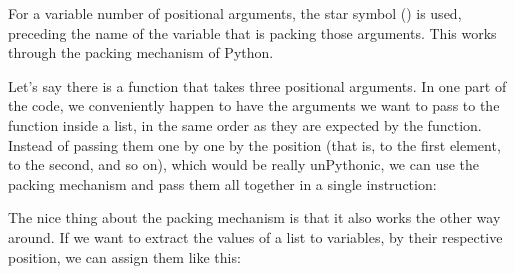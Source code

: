 \documentclass[a4paper,10pt,english]{sphinxmanual}
\begin{document}
For a variable number of positional arguments, the star symbol (\sphinxcode{\sphinxupquote{*}}) is used, preceding the name of the
variable that is packing those arguments. This works through the packing mechanism of Python.

Let’s say there is a function that takes three positional arguments. In one part of the code, we conveniently
happen to have the arguments we want to pass to the function inside a list, in the same order as they are
expected by the function. Instead of passing them one by one by the position (that is,  to the
first element,  to the second, and so on), which would be really un\sphinxhyphen{}Pythonic, we can use the
packing mechanism and pass them all together in a single instruction:

\begin{sphinxVerbatim}[commandchars=\\\{\}]
   
    
    
    
  \PYG{p}{[}  \PYG{p}{]}
\end{sphinxVerbatim}

The nice thing about the packing mechanism is that it also works the other way around. If we want to extract
the values of a list to variables, by their respective position, we can assign them like this:

\begin{sphinxVerbatim}[commandchars=\\\{\}]
    \PYG{p}{[}  \PYG{p}{]}
\end{sphinxVerbatim}
\end{document}
